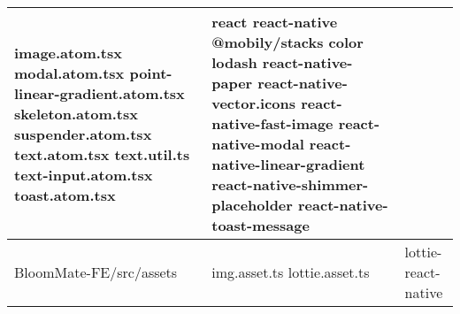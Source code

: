 \documentclass[conference, a4paper]{IEEEtran}
\begin{document}
\begin{table} [htp]
\begin{tabular}{p{1.7cm}|p{2.8cm}|p{2.5cm}}
 \newline image.atom.tsx  \newline modal.atom.tsx \newline point-linear-gradient.atom.tsx \newline skeleton.atom.tsx \newline suspender.atom.tsx \newline text.atom.tsx \newline text.util.ts \newline text-input.atom.tsx \newline toast.atom.tsx & react \newline react-native \newline @mobily/stacks \newline color \newline lodash \newline react-native-paper \newline react-native-vector.icons \newline react-native-fast-image \newline react-native-modal \newline react-native-linear-gradient \newline react-native-shimmer-placeholder \newline react-native-toast-message \\
\hline
    BloomMate-FE\newline/src/assets & img.asset.ts \newline lottie.asset.ts & lottie-react-native \\
    \hline 
    \end{tabular}
\end{table}
\end{document}
